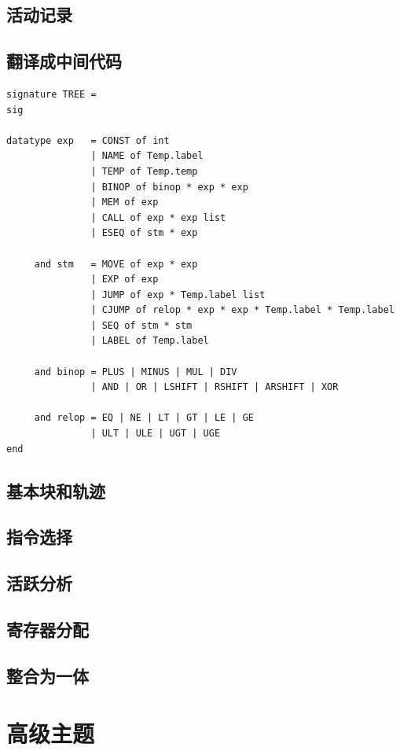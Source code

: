 \documentclass[cn,11pt,chinese]{elegantbook}
\begin{document}
\chapter{活动记录}

\chapter{翻译成中间代码}

\begin{verbatim}
signature TREE =
sig

datatype exp   = CONST of int
               | NAME of Temp.label
               | TEMP of Temp.temp
               | BINOP of binop * exp * exp
               | MEM of exp
               | CALL of exp * exp list
               | ESEQ of stm * exp

     and stm   = MOVE of exp * exp
               | EXP of exp
               | JUMP of exp * Temp.label list
               | CJUMP of relop * exp * exp * Temp.label * Temp.label
               | SEQ of stm * stm
               | LABEL of Temp.label

     and binop = PLUS | MINUS | MUL | DIV
               | AND | OR | LSHIFT | RSHIFT | ARSHIFT | XOR

     and relop = EQ | NE | LT | GT | LE | GE
               | ULT | ULE | UGT | UGE
end
\end{verbatim}

\chapter{基本块和轨迹}

\chapter{指令选择}

\chapter{活跃分析}

\chapter{寄存器分配}

\chapter{整合为一体}

\part{高级主题}
\end{document}
